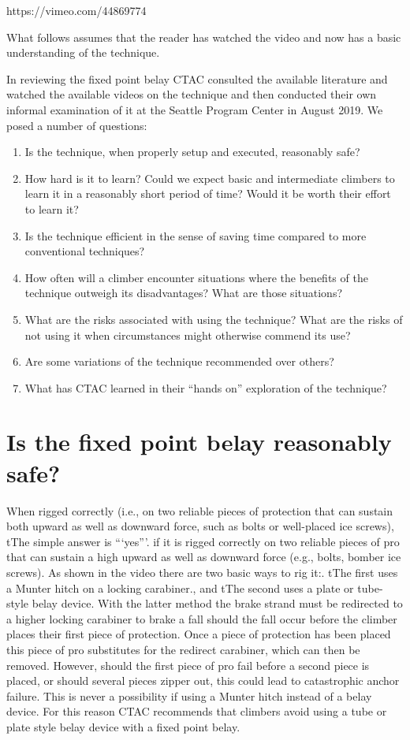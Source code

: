 \documentclass[nonacm,acmtog]{acmart}
\begin{document}
https://vimeo.com/44869774

What follows assumes that the reader has watched the video and now has a basic
understanding of the technique.

In reviewing the fixed point belay CTAC consulted the available literature and
watched the available videos on the technique and then conducted their own
informal examination of it at the Seattle Program Center in August 2019. We
posed a number of questions:

\begin{enumerate}
\item Is the technique, when properly setup and executed, reasonably safe?
\item How hard is it to learn? Could we expect basic and intermediate climbers
to learn it in a reasonably short period of time? Would it be worth their
effort to learn it?
\item Is the technique efficient in the sense of saving time compared to more
conventional techniques?
\item How often will a climber encounter situations where the benefits of the
technique outweigh its disadvantages? What are those situations?
\item What are the risks associated with using the technique? What are the
risks of not using it when circumstances might otherwise commend its use?
\item Are some variations of the technique recommended over others?
\item What has CTAC learned in their “hands on” exploration of the technique?
\end{enumerate}

\section{Is the fixed point belay reasonably safe?}
When rigged correctly (i.e., on two reliable pieces of protection that can
sustain both upward as well as downward force, such as bolts or well-placed ice
screws), tThe simple answer is “‘yes”’. if it is rigged correctly on two
reliable pieces of pro that can sustain a high upward as well as downward force
(e.g., bolts, bomber ice screws). As shown in the video there are two basic
ways to rig it:. tThe first uses a Munter hitch on a locking carabiner., and
tThe second uses a plate or tube- style belay device. With the latter method
the brake strand must be redirected to a higher locking carabiner to brake a
fall should the fall occur before the climber places their first piece of
protection. Once a piece of protection has been placed this piece of pro
substitutes for the redirect carabiner, which can then be removed. However,
should the first piece of pro fail before a second piece is placed, or should
several pieces zipper out, this could lead to catastrophic anchor failure. This
is never a possibility if using a Munter hitch instead of a belay device. For
this reason CTAC recommends that climbers avoid using a tube or plate style
belay device with a fixed point belay.
\end{document}
